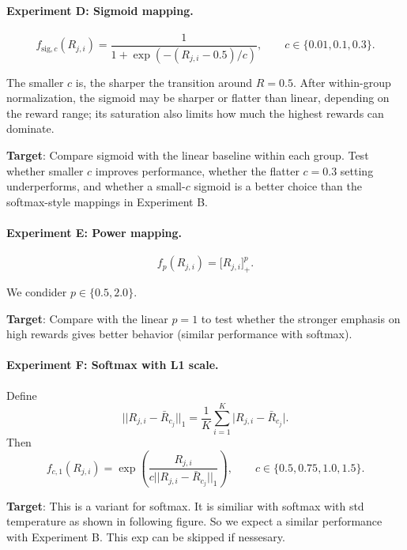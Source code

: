 \documentclass{article} %
\begin{document}
\paragraph{Experiment D: Sigmoid mapping.}
\[
f_{\mathrm{sig},c}(R_{j,i})
=\frac{1}{1+\exp(-(R_{j,i}-0.5)/c)},
\qquad c\in\{0.01,0.1,0.3\}.
\]

The smaller \(c\) is, the sharper the transition around \(R=0.5\).
After within-group normalization, the sigmoid may be sharper or flatter
than linear, depending on the reward range; its saturation also limits
how much the highest rewards can dominate.

\textbf{Target}: Compare sigmoid with the linear baseline within each group.
Test whether smaller \(c\) improves performance, whether the flatter
\(c=0.3\) setting underperforms, and whether a small-\(c\) sigmoid is a
better choice than the softmax-style mappings in Experiment B.


\paragraph{Experiment E: Power mapping.}

\[
f_p(R_{j,i})=\bigl[R_{j,i}\bigr]_+^p.
\]

We condider \(p\in\{0.5,2.0\}\).

\textbf{Target}: Compare with the linear \(p=1\) to test
whether the stronger emphasis on high rewards gives better behavior (similar
performance with softmax).

\paragraph{Experiment F: Softmax with L1 scale.}
Define
\[
||R_{j,i}-\bar{R}_{c_j}||_1=\frac{1}{K}\sum_{i=1}^{K}
\bigl|R_{j,i}-\bar R_{c_j}\bigr|.
\]
Then
\[
f_{c,1}(R_{j,i})
=\exp\!\left(\frac{R_{j,i}}{c||R_{j,i}-\bar{R}_{c_j}||_1}\right),
\qquad c\in\{0.5,0.75,1.0,1.5\}.
\]


\textbf{Target}: This is a variant for softmax. It is similiar with softmax with std temperature as shown in following figure. So we expect a similar performance with Experiment B. This exp can be skipped if nessesary.
\end{document}
